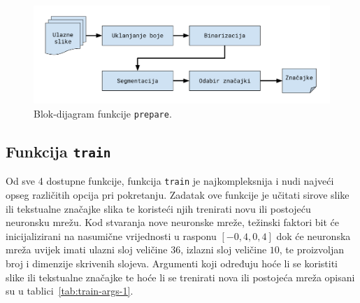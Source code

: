 \begin{figure}[htb]
    \centering
    \includegraphics[width=12cm]{images/chapter4/prepare-diagram.pdf}
    \caption{Blok-dijagram funkcije \texttt{prepare}.}
    \label{fig:prepare-diagram}
\end{figure}

\subsection{Funkcija \texttt{train}}
\label{subsec:funkcija-train}
Od sve 4 dostupne funkcije, funkcija \texttt{train} je najkompleksnija i nudi najveći opseg različitih opcija pri
pokretanju. Zadatak ove funkcije je učitati sirove slike ili tekstualne značajke slika te koristeći njih trenirati
novu ili postojeću neuronsku mrežu. Kod stvaranja nove neuronske mreže, težinski faktori bit će inicijalizirani na
nasumične vrijednosti u rasponu $[-0{,}4, 0{,}4]$ dok će neuronska mreža uvijek imati ulazni sloj veličine $36$, izlazni
sloj veličine $10$, te proizvoljan broj i dimenzije skrivenih slojeva. Argumenti koji određuju hoće li se koristiti
slike ili tekstualne značajke te hoće li se trenirati nova ili postojeća mreža opisani su u
tablici\ \ref{tab:train-args-1}.
